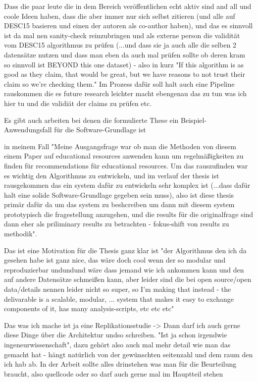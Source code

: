 \documentclass[11pt,
  paper=a4, 
  hidelinks,
  bibliography=totocnumbered,
	captions=tableheading,
	BCOR=10mm
]{scrreprt}
\theoremstyle{definition}
\begin{document}
Dass die paar leute die in dem Bereich veröffentlichen echt aktiv sind and all und coole Ideen haben, dass die aber immer nur sich selbst zitieren (und alle auf DESC15 basieren und einen der autoren als co-author haben), und das es sinnvoll ist da mal nen sanity-check reinzubringen und als externe person die validität vom DESC15 algorithmus zu prüfen (...und dass sie ja auch alle die selben 2 datensätze nutzen und dass man eben da auch mal prüfen sollte ob deren kram so sinnvoll ist BEYOND this one dataset) - also in kurz "If this algorithm is as good as they claim, that would be great, but we have reasons to not trust their claim so we're checking them." Im Prozess dafür soll halt auch eine Pipeline rauskommen die es future research leichter macht ebengenau das zu tun was ich hier tu und die validiät der claims zu prüfen etc.

Es gibt auch arbeiten bei denen die formulierte These ein Beispiel-Anwendungsfall für die Software-Grundlage ist

in meinem Fall "Meine Ausgangsfrage war ob man die Methoden von diesem einem Paper auf educational resources anwenden kann um regelmäßigkeiten zu finden für recommendations für educational resources. Um das rauszufinden war es wichtig den Algorithmus zu entwickeln, und im verlauf der thesis ist rausgekommen das ein system dafür zu entwickeln sehr komplex ist (...dass dafür halt eine solide Software-Grundlage gegeben sein muss), also ist diese thesis primär dafür da um das system zu beshcreiben um dann mit diesem system prototypisch die fragestellung anzugehen, und die results für die originalfrage sind dann eher als priliminary results zu betrachten - fokus-shift von results zu methodik".

Das ist eine Motivation für die Thesis ganz klar ist "der Algorithmus den ich da gesehen habe ist ganz nice, das wäre doch cool wenn der so modular und reproduzierbar undundund wäre dass jemand wie ich ankommen kann und den auf andere Datensätze schmeißen kann, aber leider sind die bei open source/open data/details nennen leider nicht so super, so I'm making that instead - the delivarable is a scalable, modular, ... system that makes it easy to exchange components of it, has many analysis-scripts, etc etc etc" 

Das was ich mache ist ja eine Replikationsstudie -> Dann darf ich auch gerne diese Dinge über die Architektur undso schreiben. "Ist ja schon irgendwie ingeneurwissenschaft", dazu gehört also auch mal mehr detail wie man das gemacht hat - hängt natürlich von der gewünschten seitenzahl und dem raum den ich hab ab. In der Arbeit sollte alles drinstehen was man für die Beurteilung braucht, also quellcode oder so darf auch gerne mal im Hauptteil stehen
\end{document}
